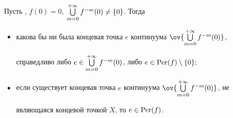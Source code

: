 \begin{lem} Пусть \fm{}, $f(0)=0$, $\bigcup\limits_{m=0}^{+\infty}f^{-m}(0) \ne \{0\}$. Тогда


\begin{itemize}


\item[3.1.] какова бы ни была концевая точка $e$ континуума $\ov{\ty}$,


справедливо либо $e\in \bigcup\limits_{m=0}^{+\infty}f^{-m}(0) $, либо $e\in \operatorname{Per}(f)\setminus \{0\};$


\item[3.2.] если существует концевая точка $e$ континуума $\ov{\ty}$, не


являющаяся концевой точкой $X$, то $e\in \operatorname{Per}(f)$.


\end{itemize}


\end{lem}





